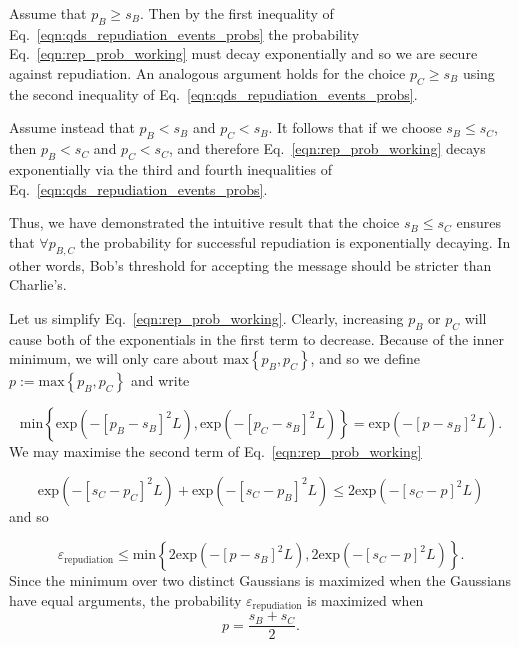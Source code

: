 \noindent Assume that $p_B \ge s_B$. Then by the first inequality of Eq.~\ref{eqn:qds_repudiation_events_probs} the probability Eq.~\ref{eqn:rep_prob_working} must decay exponentially %
and so we are secure against repudiation. An analogous argument holds for the choice $p_C \ge s_B$ using the second inequality of Eq.~\ref{eqn:qds_repudiation_events_probs}.

\noindent Assume instead that $p_B < s_B$ and $p_C < s_B$. It follows that if we choose $s_B \le s_C$, then $p_B < s_C$ and $p_C < s_C$, and therefore Eq.~\ref{eqn:rep_prob_working} decays exponentially via the third and fourth inequalities of Eq.~\ref{eqn:qds_repudiation_events_probs}.

Thus, we have demonstrated the intuitive result that the choice $s_B \le s_C$ ensures that $\forall p_{B, C}$ the probability for successful repudiation is exponentially decaying. In other words, Bob's threshold for accepting the message should be stricter than Charlie's.

Let us simplify Eq.~\ref{eqn:rep_prob_working}. Clearly, increasing $p_B$ or $p_C$ will cause both of the exponentials in the first term to decrease. Because of the inner minimum, we will only care about $\text{max}\left\{p_B, p_C\right\}$, and so we define $p := \text{max}\left\{p_B, p_C\right\}$ and write

\begin{equation}
\text{min}\left\{\text{exp}\left(- \left[p_B - s_B\right]^2L\right), \text{exp}\left(- \left[p_C - s_B\right]^2L\right)\right\} = \text{exp}\left(-\left[p - s_B\right]^2L\right).
\end{equation}
We may maximise the second term of Eq.~\ref{eqn:rep_prob_working} 

\begin{equation}
\text{exp}\left(- \left[s_C - p_C\right]^2 L \right) + \text{exp}\left(- \left[s_C - p_B\right]^2 L \right) \le 2 \text{exp}\left( - \left[s_C - p\right]^2 L\right)
\end{equation}
and so

\begin{equation}
\varepsilon_{\text{repudiation}} \le \text{min}\left\{ 2 \text{exp}\left( - \left[p - s_B\right]^2 L \right), 2 \text{exp}\left( - \left[s_C - p\right]^2 L \right) \right\}.
\end{equation}
Since the minimum over two distinct Gaussians is maximized when the Gaussians have equal arguments, the probability $\varepsilon_{\text{repudiation}}$ is maximized when 
\begin{equation}
p = \frac{s_B + s_C}{2}.
\end{equation}

